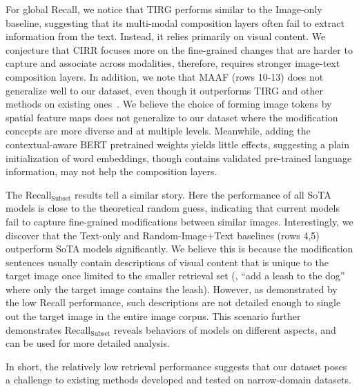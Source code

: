 \documentclass[10pt,twocolumn,letterpaper]{article}
\begin{document}
For global Recall, we notice that TIRG performs similar to the Image-only baseline, suggesting that its multi-modal composition layers often fail to extract information from the text. Instead, it relies primarily on visual content. We conjecture that CIRR focuses more on the fine-grained changes that are harder to capture and associate across modalities, therefore, requires stronger image-text composition layers. In addition, we note that MAAF (rows 10-13) does not generalize well to our dataset, even though it outperforms TIRG and other methods on existing ones~\cite{dodds2020modality_maaf}. We believe the choice of forming image tokens by spatial feature maps does not generalize to our dataset where the modification concepts are more diverse and at multiple levels. Meanwhile, adding the contextual-aware BERT pretrained weights yields little effects, suggesting a plain initialization of word embeddings, though contains validated pre-trained language information, may not help the composition layers.

The Recall$_{\text{Subset}}$ results tell a similar story. Here the performance of all SoTA models is close to the theoretical random guess, indicating that current models fail to capture fine-grained modifications between similar images.
Interestingly, we discover that the Text-only and Random-Image$+$Text baselines (rows 4,5) outperform SoTA models significantly. We believe this is because the modification sentences usually contain descriptions of visual content that is unique to the target image once limited to the smaller retrieval set (\eg, ``add a leash to the dog'' where only the target image contains the leash).
However, as demonstrated by the low Recall performance, such descriptions are not detailed enough to single out the target image in the entire image corpus.
This scenario further demonstrates Recall$_{\text{Subset}}$ reveals behaviors of models on different aspects, and can be used for more detailed analysis. 

In short, the relatively low retrieval performance suggests that our dataset poses a challenge to existing methods developed and tested on narrow-domain datasets.
\end{document}

